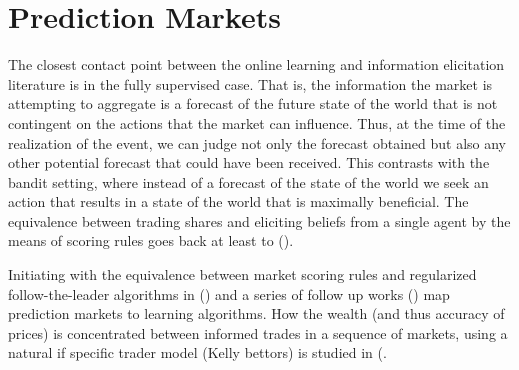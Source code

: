 


\section{Prediction Markets} 

The closest contact point between the online learning and information elicitation literature is in the fully supervised case.
That is, the information the market is attempting to aggregate is a forecast of the future state of the world that is not contingent on the actions that the market can influence. Thus, at the time of the realization of the event, we can judge not only the forecast obtained but also any other potential forecast that could have been received. 
This contrasts with the bandit setting, where instead of a forecast of the state of the world we seek an action that results in a state of the world that is maximally beneficial.
The equivalence between trading shares and eliciting beliefs from a single agent by the means of scoring rules goes back at least to (\cite{savage1971elicitation}). 





Initiating with the equivalence between market scoring rules and regularized follow-the-leader algorithms in (\cite{chen2010new}) and a series of follow up works (\cite{abernethy2013efficient, frongillo2012interpreting, hu2014multi, frongillo2015convergence}) map prediction markets to learning algorithms. 
How the wealth (and thus accuracy of prices) is concentrated between informed trades in a sequence of markets, using a natural if specific trader model (Kelly bettors) is studied in (\cite{beygelzimer2012learning)}.

